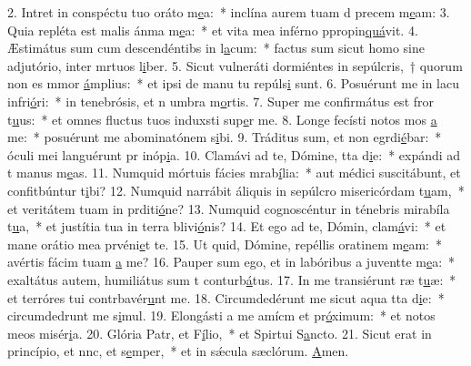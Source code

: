 2. Intret in conspéctu tuo oráto m\uline{e}a:~* inclína aurem tuam d precem m\uline{e}am:
3. Quia repléta est malis ánma m\uline{e}a:~* et vita mea inférno ppropin\uline{quá}vit.
4. Æstimátus sum cum descendéntibs in l\uline{a}cum:~* factus sum sicut homo sine adjutório, inter mrtuos l\uline{i}ber.
5. Sicut vulneráti dormiéntes in sepúlcris,~† quorum non es mmor \uline{á}mplius:~* et ipsi de manu tu repúls\uline{i} sunt.
6. Posuérunt me in lacu infri\uline{ó}ri:~* in tenebrósis, et n umbra m\uline{o}rtis.
7. Super me confirmátus est fror t\uline{u}us:~* et omnes fluctus tuos induxsti sup\uline{e}r me.
8. Longe fecísti notos mos \uline{a} me:~* posuérunt me abominatónem s\uline{i}bi.
9. Tráditus sum, et non egrdi\uline{é}bar:~* óculi mei languérunt pr inóp\uline{i}a.
10. Clamávi ad te, Dómine, tta d\uline{i}e:~* expándi ad t manus m\uline{e}as.
11. Numquid mórtuis fácies mrab\uline{í}lia:~* aut médici suscitábunt, et confitbúntur t\uline{i}bi?
12. Numquid narrábit áliquis in sepúlcro misericórdam t\uline{u}am,~* et veritátem tuam in prditi\uline{ó}ne?
13. Numquid cognoscéntur in ténebris mirabíla t\uline{u}a,~* et justítia tua in terra blivi\uline{ó}nis?
14. Et ego ad te, Dómin, clam\uline{á}vi:~* et mane orátio mea prvéni\uline{e}t te.
15. Ut quid, Dómine, repéllis oratinem m\uline{e}am:~* avértis fácim tuam \uline{a} me?
16. Pauper sum ego, et in labóribus a juventte m\uline{e}a:~* exaltátus autem, humiliátus sum t conturb\uline{á}tus.
17. In me transiérunt ræ t\uline{u}æ:~* et terróres tui contrbavér\uline{u}nt me.
18. Circumdedérunt me sicut aqua tta d\uline{i}e:~* circumdedrunt me s\uline{i}mul.
19. Elongásti a me amícm et pr\uline{ó}ximum:~* et notos meos  misér\uline{i}a.
20. Glória Patr, et F\uline{í}lio,~* et Spirtui S\uline{a}ncto.
21. Sicut erat in princípio, et nnc, et s\uline{e}mper,~* et in sǽcula sæclórum. \uline{A}men.
